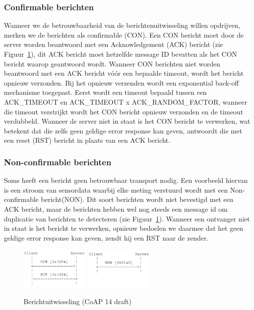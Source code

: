 \subsubsection{Confirmable berichten}

Wanneer we de betrouwbaarheid van de berichtenuitwisseling willen opdrijven, merken we de berichten als confirmable (CON). Een CON bericht moet door de server worden beantwoord met een Acknowledgement (ACK) bericht (zie Figuur~\ref{fig:berichtuitwisseling}), dit ACK bericht moet hetzelfde message ID bevatten als het CON bericht waarop geantwoord wordt. Wanneer CON berichten niet worden beantwoord met een ACK bericht v\'{o}\'{o}r een bepaalde timeout, wordt het bericht opnieuw verzonden. Bij het opnieuw verzenden wordt een exponential back-off mechanisme toegepast. Eerst wordt een timeout bepaald tussen een ACK\_TIMEOUT en ACK\_TIMEOUT x ACK\_RANDOM\_FACTOR, wanneer die timeout verstrijkt wordt het CON bericht opnieuw verzonden en de timeout verdubbeld. Wanneer de server niet in staat is het CON bericht te verwerken, wat betekent dat die zelfs geen geldige error response kan geven, antwoordt die met een reset (RST) bericht in plaats van een ACK bericht.

\subsubsection{Non-confirmable berichten}

Soms heeft een bericht geen betrouwbaar transport nodig. Een voorbeeld hiervan is een stroom van sensordata waarbij elke meting verstuurd wordt met een Non-confirmable bericht(NON). Dit soort berichten wordt niet bevestigd met een ACK bericht, maar de berichten hebben wel nog steeds een message id om duplicatie van berichten te detecteren (zie Figuur~\ref{fig:berichtuitwisseling}). Wanneer een ontvanger niet in staat is het bericht te verwerken, opnieuw bedoelen we daarmee dat het geen geldige error response kan geven, zendt hij een RST naar de zender.

\begin{figure}[h]
\vspace{10pt}
\centering
{}
{\includegraphics[width=0.3\textwidth]{fig/CoAPConfirmable}}
\hspace{30pt}
{\includegraphics[width=0.3\textwidth]{fig/CoAPNonConfirmable}}
\caption{Berichtuitwisseling (CoAP 14 draft)}
\label{fig:berichtuitwisseling}
\end{figure}


